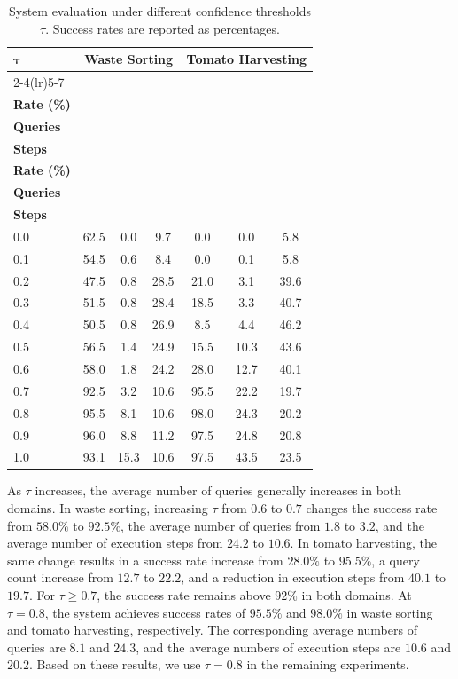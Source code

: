 \begin{table}[t]
\centering
\caption{System evaluation under different confidence thresholds $\tau$. Success rates are reported as percentages.}
\label{tab:sys_tau}
\small
\setlength{\tabcolsep}{3pt}
\begin{tabular*}{\textwidth}{@{\extracolsep{\fill}}lcccccc}
\toprule
\multirow{2}{*}{$\boldsymbol{\tau}$} & \multicolumn{3}{c}{\textbf{Waste Sorting}} & \multicolumn{3}{c}{\textbf{Tomato Harvesting}} \\
\cmidrule(lr){2-4}\cmidrule(lr){5-7}
& \makecell{\textbf{Success}\\\textbf{Rate (\%)}} & \makecell{\textbf{Avg.}\\\textbf{Queries}} & \makecell{\textbf{Avg.}\\\textbf{Steps}} & \makecell{\textbf{Success}\\\textbf{Rate (\%)}} & \makecell{\textbf{Avg.}\\\textbf{Queries}} & \makecell{\textbf{Avg.}\\\textbf{Steps}} \\
\midrule
0.0 & 62.5 & 0.0  & 9.7  & 0.0  & 0.0  & 5.8  \\
0.1 & 54.5 & 0.6  & 8.4  & 0.0  & 0.1  & 5.8  \\
0.2 & 47.5 & 0.8  & 28.5 & 21.0 & 3.1  & 39.6 \\
0.3 & 51.5 & 0.8  & 28.4 & 18.5 & 3.3  & 40.7 \\
0.4 & 50.5 & 0.8  & 26.9 & 8.5  & 4.4  & 46.2 \\
0.5 & 56.5 & 1.4  & 24.9 & 15.5 & 10.3 & 43.6 \\
0.6 & 58.0 & 1.8  & 24.2 & 28.0 & 12.7 & 40.1 \\
0.7 & 92.5 & 3.2  & 10.6 & 95.5 & 22.2 & 19.7 \\
0.8 & 95.5 & 8.1  & 10.6 & 98.0 & 24.3 & 20.2 \\
0.9 & 96.0 & 8.8  & 11.2 & 97.5 & 24.8 & 20.8 \\
1.0 & 93.1 & 15.3 & 10.6 & 97.5 & 43.5 & 23.5 \\
\bottomrule
\end{tabular*}
\end{table}


As $\tau$ increases, the average number of queries generally increases in both domains. In waste sorting, increasing $\tau$ from $0.6$ to $0.7$ changes the success rate from $58.0\%$ to $92.5\%$, the average number of queries from $1.8$ to $3.2$, and the average number of execution steps from $24.2$ to $10.6$. In tomato harvesting, the same change results in a success rate increase from $28.0\%$ to $95.5\%$, a query count increase from $12.7$ to $22.2$, and a reduction in execution steps from $40.1$ to $19.7$. For $\tau \geq 0.7$, the success rate remains above $92\%$ in both domains. At $\tau=0.8$, the system achieves success rates of $95.5\%$ and $98.0\%$ in waste sorting and tomato harvesting, respectively. The corresponding average numbers of queries are $8.1$ and $24.3$, and the average numbers of execution steps are $10.6$ and $20.2$. Based on these results, we use $\tau=0.8$ in the remaining experiments.


